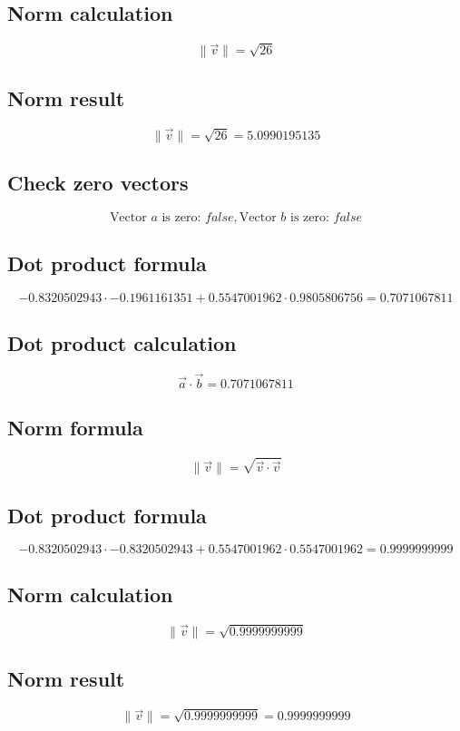 \documentclass{article}
\begin{document}
\subsection*{ \vspace{1em} Norm calculation}
\[
\|\vec{v}\| = \sqrt{26}
\]
\subsection*{ \vspace{1em} Norm result}
\[
\|\vec{v}\| = \sqrt{26} = 5.0990195135
\]
\subsection*{ \vspace{1em} Check zero vectors}
\[
\text{Vector } a \text{ is zero: } false, \text{Vector } b \text{ is zero: } false
\]
\subsection*{ \vspace{1em} Dot product formula}
\[
-0.8320502943 \cdot -0.1961161351 + 0.5547001962 \cdot 0.9805806756 = 0.7071067811
\]
\subsection*{ \vspace{1em} Dot product calculation}
\[
\vec{a} \cdot \vec{b} = 0.7071067811
\]
\subsection*{ \vspace{1em} Norm formula}
\[
\|\vec{v}\| = \sqrt{\vec{v} \cdot \vec{v}}
\]
\subsection*{ \vspace{1em} Dot product formula}
\[
-0.8320502943 \cdot -0.8320502943 + 0.5547001962 \cdot 0.5547001962 = 0.9999999999
\]
\subsection*{ \vspace{1em} Norm calculation}
\[
\|\vec{v}\| = \sqrt{0.9999999999}
\]
\subsection*{ \vspace{1em} Norm result}
\[
\|\vec{v}\| = \sqrt{0.9999999999} = 0.9999999999
\]
\end{document}
